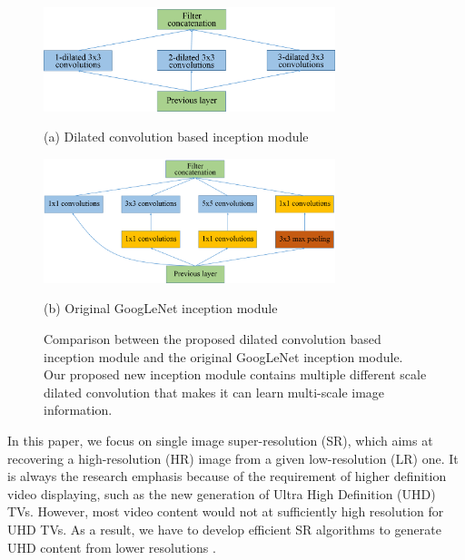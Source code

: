\documentclass{article}
\begin{document}
\begin{figure}[htb]

\begin{minipage}[b]{1.0\linewidth}
  \centering
  \centerline{\includegraphics[width=8.5cm]{multiscaleinformationlearninginception.png}}
  \centerline{(a) Dilated convolution based inception module}\medskip
\end{minipage}
%
\begin{minipage}[b]{1.0\linewidth}
  \centering
  \centerline{\includegraphics[width=8.5cm]{googlenetInception.png}}
  \centerline{(b) Original GoogLeNet inception module~\cite{ref14}}\medskip
\end{minipage}
\vspace{-0.98cm}
\caption{Comparison between the proposed dilated convolution based inception module and the original GoogLeNet inception module. Our proposed new inception module contains multiple different scale dilated convolution that makes it can learn multi-scale image information.}
\label{fig:comparison}
\vspace{-0.6cm}
%
\end{figure}


In this paper, we focus on single image super-resolution (SR), which aims at recovering a high-resolution (HR) image from a given low-resolution (LR) one. It is always the research emphasis because of the requirement of higher definition video displaying, such as the new generation of Ultra High Definition (UHD) TVs. However, most video content would not at sufficiently high resolution for UHD TVs. As a result, we have to develop efficient SR algorithms to generate UHD content from lower resolutions \cite{ref1}.
\end{document}
